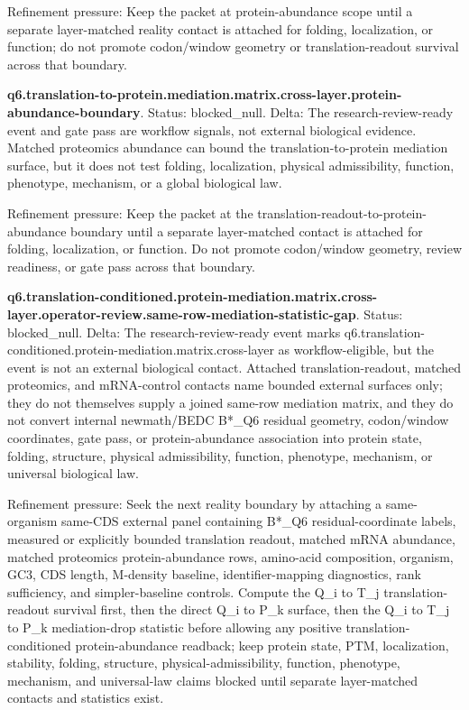 Refinement pressure: Keep the packet at protein-abundance scope until a separate layer-matched reality contact is attached for folding, localization, or function; do not promote codon/window geometry or translation-readout survival across that boundary.

\textbf{q6.translation-to-protein.mediation.matrix.cross-layer.protein-abundance-boundary}. Status: blocked\_null. Delta: The research-review-ready event and gate pass are workflow signals, not external biological evidence. Matched proteomics abundance can bound the translation-to-protein mediation surface, but it does not test folding, localization, physical admissibility, function, phenotype, mechanism, or a global biological law.

Refinement pressure: Keep the packet at the translation-readout-to-protein-abundance boundary until a separate layer-matched contact is attached for folding, localization, or function. Do not promote codon/window geometry, review readiness, or gate pass across that boundary.

\textbf{q6.translation-conditioned.protein-mediation.matrix.cross-layer.operator-review.same-row-mediation-statistic-gap}. Status: blocked\_null. Delta: The research-review-ready event marks q6.translation-conditioned.protein-mediation.matrix.cross-layer as workflow-eligible, but the event is not an external biological contact. Attached translation-readout, matched proteomics, and mRNA-control contacts name bounded external surfaces only; they do not themselves supply a joined same-row mediation matrix, and they do not convert internal newmath/BEDC B*\_Q6 residual geometry, codon/window coordinates, gate pass, or protein-abundance association into protein state, folding, structure, physical admissibility, function, phenotype, mechanism, or universal biological law.

Refinement pressure: Seek the next reality boundary by attaching a same-organism same-CDS external panel containing B*\_Q6 residual-coordinate labels, measured or explicitly bounded translation readout, matched mRNA abundance, matched proteomics protein-abundance rows, amino-acid composition, organism, GC3, CDS length, M-density baseline, identifier-mapping diagnostics, rank sufficiency, and simpler-baseline controls. Compute the Q\_i to T\_j translation-readout survival first, then the direct Q\_i to P\_k surface, then the Q\_i to T\_j to P\_k mediation-drop statistic before allowing any positive translation-conditioned protein-abundance readback; keep protein state, PTM, localization, stability, folding, structure, physical-admissibility, function, phenotype, mechanism, and universal-law claims blocked until separate layer-matched contacts and statistics exist.

